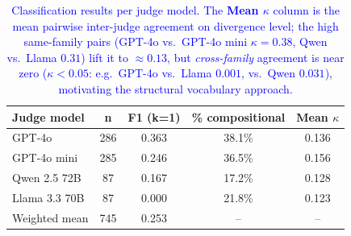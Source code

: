 \documentclass[12pt]{article}
\begin{document}
\begin{table}[H]
\centering
\begin{tabular}{lcccc}
\toprule
\textbf{Judge model} & \textbf{n} & \textbf{F1 (k=1)} & \textbf{\% compositional} & \textbf{Mean $\kappa$} \\
\midrule
GPT-4o         & 286 & 0.363 & 38.1\% & 0.136 \\
GPT-4o mini    & 285 & 0.246 & 36.5\% & 0.156 \\
Qwen 2.5 72B   &  87 & 0.167 & 17.2\% & 0.128 \\
Llama 3.3 70B  &  87 & 0.000 & 21.8\% & 0.123 \\
\midrule
Weighted mean  & 745 & 0.253 & -- & -- \\
\bottomrule
\end{tabular}
\caption{\textcolor{blue}{Classification results per judge model. The \textbf{Mean $\kappa$} column is the mean pairwise inter-judge agreement on divergence level; the high same-family pairs (GPT-4o vs.\ GPT-4o mini $\kappa=0.38$, Qwen vs.\ Llama $0.31$) lift it to ${\approx}0.13$, but \emph{cross-family} agreement is near zero ($\kappa<0.05$: e.g.\ GPT-4o vs.\ Llama $0.001$, vs.\ Qwen $0.031$), motivating the structural vocabulary approach.}}
\label{tab:divergence_by_model}
\end{table}
\end{document}
